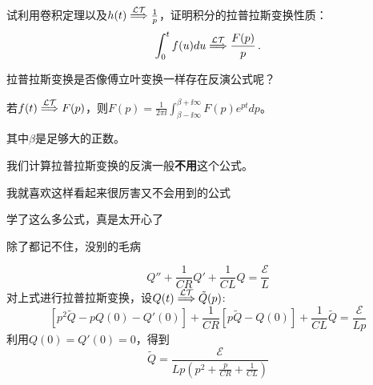 \documentclass[CJK]{beamer}
\begin{document}
\begin{frame}
  \bch


    试利用卷积定理以及$h(t) \stackrel{\mathcal{LT}}{\Longrightarrow} \frac{1}{p}$，证明积分的拉普拉斯变换性质：
    $$ \int_0^t f(u) du \stackrel{\mathcal{LT}}{\Longrightarrow} \frac{F(p)}{p} \, . $$
  \ech
\end{frame}

\begin{frame}
  \bch

{\Large 拉普拉斯变换是否像傅立叶变换一样存在反演公式呢？}
  \ech
\end{frame}

\begin{frame}
  \bch
      {\blue 若$f(t) \stackrel{\mathcal{LT}}{\Longrightarrow} F(p)$，则$F(p) = \frac{1}{2\pi \ii} \int_{\beta-\ii\infty}^{\beta+\ii \infty}F(p)e^{pt}dp$}。
      
      其中$\beta$是足够大的正数。

      \skipline
      
      我们计算拉普拉斯变换的反演一般{\bf 不用}这个公式。

      \skipline
      
      \bcenter
      
      我就喜欢这样看起来很厉害又不会用到的公式
      \ecenter
  \ech
\end{frame}

\begin{frame}
  \bch
  \bcenter
  学了这么多公式，真是太开心了


  除了都记不住，没别的毛病
  \ecenter
  \ech
\end{frame}


\begin{frame}
  \bch
  
  \ech
\end{frame}


\begin{frame}
  \bch
  $$Q''+ \frac{1}{CR} Q' +  \frac{1}{CL}Q = \frac{\mathcal{E}}{L} $$  
  对上式进行拉普拉斯变换，设$Q(t) \stackrel{\mathcal{LT}}{\Longrightarrow} \tilde{Q}(p)$:
  $$ \left[p^2 \tilde{Q} - pQ(0) - Q'(0)\right] + \frac{1}{CR} \left[p\tilde{Q} - Q(0)\right] + \frac{1}{CL} \tilde{Q} = \frac{\mathcal{E}}{L p } $$
  利用$Q(0) = Q'(0) = 0$，得到
  $$  \tilde{Q} = \frac{\mathcal{E}}{Lp\left(p^2+\frac{p}{CR} + \frac{1}{CL}\right)} $$
  \ech
\end{frame}
\end{document}
